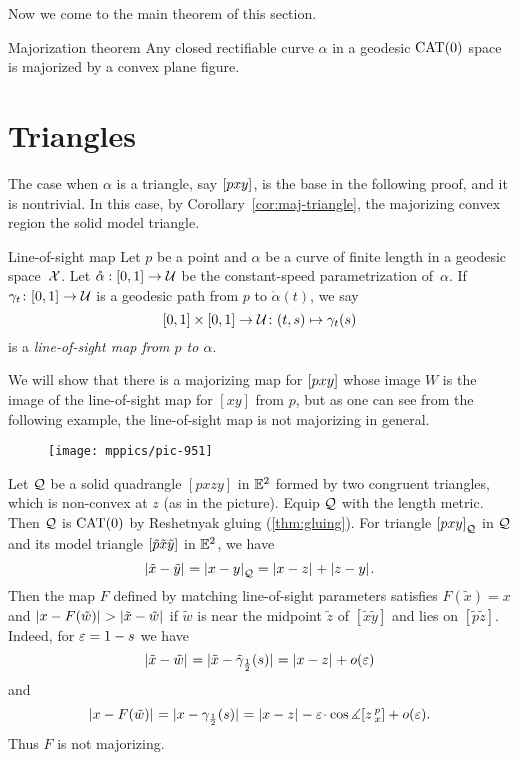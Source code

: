 Now we come to the main theorem of this section.

\begin{thm}{Majorization theorem}\label{thm:majorization}
\label{thm:major}
Any closed rectifiable curve $\alpha$ in a geodesic $\mathrm{CAT}(0)$ space is majorized by a convex plane figure. \end{thm}

\section{Triangles}

The case when $\alpha$ is a triangle, say $[pxy]$, is the base in the following proof, and it is nontrivial.
In this case, by Corollary~\ref{cor:maj-triangle}, the majorizing convex region the solid model triangle. 

\begin{thm}{Line-of-sight map} \label{def:sight}
Let $p$ be a point and $\alpha$ be a curve of finite length in a geodesic space~$\mathcal{X}$. 
Let $\mathring\alpha:[0,1]\to\mathcal{U}$ be the constant-speed parametrization of~$\alpha$.  
If   $\gamma_t\colon[0,1]\to\mathcal{U}$ is a geodesic path from $p$ to $\mathring\alpha(t)$, we say 
\[
[0,1]\times[0,1]\to\mathcal{U}\colon(t,s)\mapsto\gamma_t(s)
\]
is a \emph{line-of-sight map from $p$ to $\alpha$}.  
\end{thm}

We will show that there is a majorizing map for $[pxy]$ whose image $W$ is the image of the line-of-sight map for $[x y]$ from  $p$,
but as one can see from the following example, the line-of-sight map is not majorizing in general.



\begin{wrapfigure}{r}{30 mm}
\vskip-0mm
\centering
\texttt{[image: mppics/pic-951]}
\end{wrapfigure}

 Let $\mathcal{Q}$ be a solid quadrangle $[p x z y]$ in $\mathbb{E}^2$ formed by two congruent triangles, which is non-convex at $z$ (as in the picture).  
Equip $\mathcal{Q}$ with the length metric. 
Then $\mathcal{Q}$ is $\mathrm{CAT}(0)$
by Reshetnyak gluing  (\ref{thm:gluing}). 
For triangle ${[pxy]}_{\mathcal{Q}}$ in $\mathcal{Q}$ and its model triangle $[\tilde p\tilde x\tilde y]$ in $\mathbb{E}^2$,  
we have 
\[\dist{\tilde x}{\tilde y}{}=\dist{x}{y}{\spc{Q}}=\dist{x}{z}{}+\dist{z}{y}{}.\]
Then the map $F$ defined by matching line-of-sight parameters satisfies $F(\tilde x)=x$ and $\dist{x}{F(\tilde w)}{}>\dist{\tilde x}{\tilde w}{}$ if $\tilde w$ is near the midpoint $\tilde z$ of $[\tilde x\tilde y]$ and lies on $[\tilde p\tilde z]$. 
Indeed, for $\varepsilon=1-s$ we have
\[\dist{\tilde x}{\tilde w}{}
=\dist{\tilde x}{\tilde \gamma_\frac12(s)}{}
=\dist{x}{z}{}+o(\eps)\] and 
\[\dist{x}{F(\tilde w)}{}
=\dist{x}{\gamma_\frac12(s)}{}
=\dist{x}{z}{}-\eps\cdot\cos\mangle\hinge z p x+o(\eps).\]  
Thus $F$ is not majorizing.

